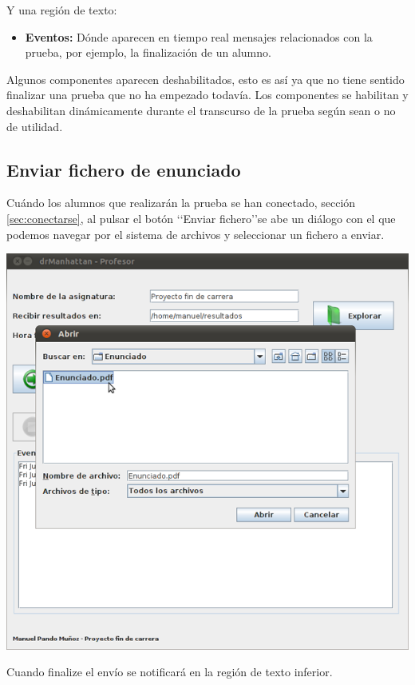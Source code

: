\documentclass[11pt]{article}
\begin{document}
Y una región de texto:

\begin{itemize}
    \item {\bfseries Eventos:} Dónde aparecen en tiempo real mensajes relacionados con la prueba, por ejemplo, la finalización de un alumno.
\end{itemize}

Algunos componentes aparecen deshabilitados, esto es así ya que no tiene sentido finalizar una prueba que no ha empezado todavía. Los componentes se habilitan y deshabilitan dinámicamente durante el transcurso de la prueba según sean o no de utilidad.


\subsection{Enviar fichero de enunciado}

Cuándo los alumnos que realizarán la prueba se han conectado, sección \ref{sec:conectarse}, al pulsar el botón \lq\lq Enviar fichero\rq\rq se abe un diálogo con el que podemos navegar por el sistema de archivos y seleccionar un fichero a enviar.

\begin{center}
    \includegraphics[width=.90\linewidth]{imagenes/enviar}
\end{center}

Cuando finalize el envío se notificará en la región de texto inferior.
\end{document}
